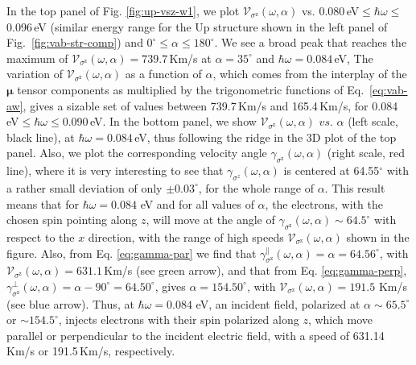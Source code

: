 \documentclass[floatfix,prb,aps,superscriptaddress,showpacs,11pt,preprint,letterpaper]{revtex4}
\begin{document}
In the top panel of Fig. \ref{fig:up-vsz-w1}, we plot
$\mathcal{V}_{\sigma^{\mathrm{z}}} (\omega,\alpha)$ vs.
0.080\,eV$\leq\hbar\omega\leq$0.096\,eV (similar energy range for the Up
structure shown in the left panel of Fig.~\ref{fig:vab-str-comp}) and
$0^\circ\leq\alpha\leq 180^\circ$. We see a broad peak that reaches the maximum
of $\mathcal{V}_{\sigma^{\mathrm{z}}}(\omega,\alpha) = 739.7$\,Km/s at
$\alpha=35^{\circ}$ and $\hbar\omega= 0.084$\,eV,  The variation of
$\mathcal{V}_{\sigma^{\mathrm{z}}} (\omega,\alpha)$ as a function of $\alpha$,
which comes from the interplay of the $\boldsymbol{\mu}$ tensor components as
multiplied by the  trigonometric functions of Eq.~\eqref{eq:vab-aw}, gives a
sizable set of values between 739.7\,Km/s and 165.4\,Km/s, for
0.084\,eV$\leq\hbar\omega\leq$0.090\,eV. In the bottom panel, we show
$\mathcal{V}_{\sigma^{\mathrm{z}}} (\omega,\alpha)$ $vs.$ $\alpha$ (left scale,
black line), at $\hbar\omega= 0.084$\,eV, thus following the ridge in the 3D
plot of the top panel. Also, we plot the corresponding velocity angle
$\gamma_{\sigma^\mathrm{z}}(\omega,\alpha)$ (right scale, red line), where it
is very interesting to see that $\gamma_{\sigma^z}(\omega,\alpha)$ is centered
at 64.55$^\circ$ with a rather small deviation of only $\pm 0.03^\circ$, for
the whole range of $\alpha$. This result means that for $\hbar\omega=0.084$ eV
and for all values of $\alpha$, the electrons, with the chosen spin pointing
along $z$, will move at the angle of $\gamma_{\sigma^\mathrm{z}}(\omega,\alpha)
\sim 64.5^{\circ}$ with respect to the $x$ direction, with the range of  high
speeds $\mathcal{V}_{\sigma^{\mathrm{z}}} (\omega,\alpha)$ shown in the figure.
Also, from Eq. \eqref{eq:gamma-par} we find that
$\gamma^\parallel_{\sigma^\mathrm{z}} (\omega,\alpha)=\alpha = 64.56^\circ$,
with $\mathcal{V}_{\sigma^{\mathrm{z}}} (\omega,\alpha) = 631.1$\,Km/s (see
green arrow), and that from Eq. \eqref{eq:gamma-perp},
$\gamma^\perp_{\sigma^\mathrm{z}}(\omega,\alpha)=\alpha-90^\circ=64.50^\circ$,
gives $\alpha=154.50^\circ$, with
$\mathcal{V}_{\sigma^{\mathrm{z}}}(\omega,\alpha) = 191.5$ Km/s (see blue
arrow). Thus, at $\hbar\omega=0.084$ eV, an incident field, polarized at
$\alpha \sim 65.5^\circ$ or $\sim 154.5^\circ$, injects electrons with their
spin polarized along $z$, which move parallel or perpendicular to the incident
electric field,  with a speed of 631.14\,Km/s or 191.5\,Km/s, respectively.
\end{document}
